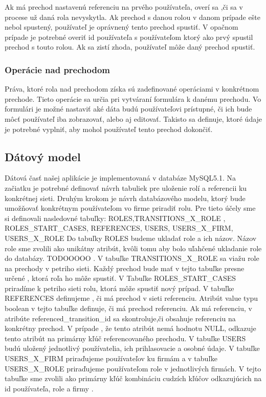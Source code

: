 Ak má prechod nastavenú referenciu na prvého používateľa, overí sa ,či sa v procese už daná rola nevyskytla. Ak prechod s danou rolou v danom prípade ešte nebol spustený, používateľ je oprávnený tento prechod spustiť. V opačnom prípade je potrebné overiť id používateľa s používateľom ktorý ako prvý spustil prechod s touto rolou. Ak sa zistí zhoda, používateľ môže daný prechod spustiť.



\subsubsection{Operácie nad prechodom}	
Práva, ktoré rola nad prechodom získa sú zadefinované operáciami v konkrétnom prechode. Tieto operácie sa určia pri vytváraní formulára k danému prechodu.  
Vo formulári je možné nastaviť aké dáta budú používateľovi prístupné, či ich bude môcť používateľ iba zobrazovať, alebo aj editovať. Takisto sa definuje, ktoré údaje je potrebné vyplniť, aby mohol používateľ tento prechod dokončiť.


\subsection{Dátový model}
Dátová časť našej aplikácie je implementovaná v databáze MySQL5.1. Na začiatku je potrebné definovať návrh tabuliek pre uloženie rolí a referencii ku konkrétnej sieti. Druhým krokom je návrh databázového modelu, ktorý bude umožňovať konkrétnym používateľom vo firme priradiť rolu.
Pre tieto účely sme si definovali nasledovné tabuľky:
ROLES,TRANSITIONS\_X\_ROLE , ROLES\_START\_CASES, REFERENCES, USERS, USERS\_X\_FIRM, USERS\_X\_ROLE 
Do tabuľky ROLES budeme ukladať role a ich názov. Názov role sme zvolili ako unikátny atribút, kvôli tomu aby bolo uľahčené ukladanie role do databázy. TODOOOOO . V tabuľke TRANSITIONS\_X\_ROLE sa viažu role na prechody v petriho sieti. Každý prechod bude mať v tejto tabuľke presne určené , ktorá roľa ho môže spustiť. V Tabuľke ROLES\_START\_CASES priradíme k petriho sieti rolu, ktorá môže spustiť nový prípad. V tabuľke REFERENCES definujeme , či má prechod v sieti referenciu. Atribút  value typu boolean v tejto tabuľke definuje, či má prechod referenciu. Ak má referenciu, v atribúte referenced\_transition\_id sa skontroluje,či obsahuje referenciu na konkrétny prechod. V prípade , že tento atribút nemá hodnotu NULL, odkazuje tento atribút na primárny kľúč referencovaného prechodu. V tabuľke USERS budú uložený jednotlivý používatelia, ich prihlasovacie a osobné údaje. V tabuľke USERS\_X\_FIRM priraďujeme používateľov ku firmám a v tabuľke USERS\_X\_ROLE priraďujeme používateľom role v jednotlivých firmách. V tejto tabuľke sme zvolili ako primárny kľúč kombináciu cudzích kľúčov odkazujúcich na id používateľa, role a firmy . 



